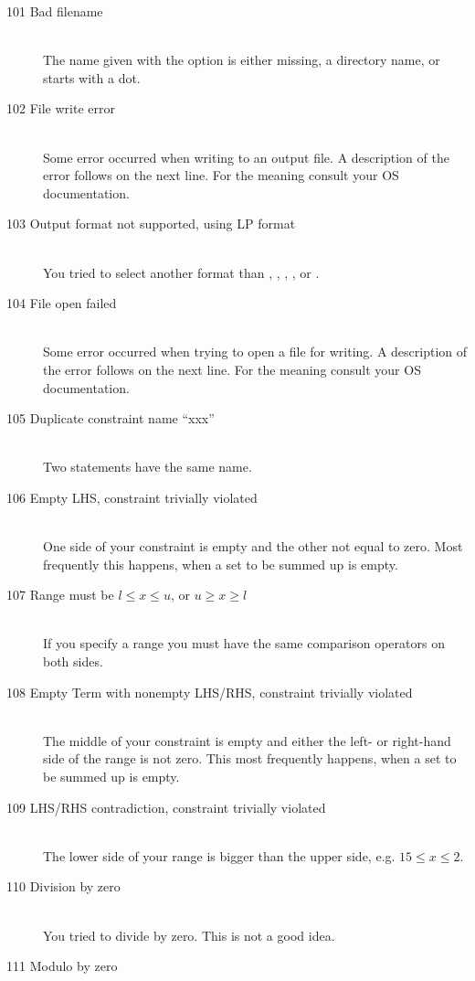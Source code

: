 \begin{description}
%
%
\item[101 Bad filename]\ \\
   The name given with the  option is either missing, 
   a directory name, or starts with a dot.
\item[102 File write error]\ \\
   Some error occurred when writing to an output file. A description of 
   the error follows on the next line. For the meaning 
   consult your OS documentation.
\item[103 Output format not supported, using LP format]\ \\
   You tried to select another format than , ,
   , , or .
\item[104 File open failed]\ \\
   Some error occurred when trying to open a file for writing. A description of 
   the error follows on the next line. For the meaning 
   consult your OS documentation.
%
%
\item[105 Duplicate constraint name ``xxx'']\ \\
   Two  statements have the same name.
\item[106 Empty LHS, constraint trivially violated]\ \\
   One side of your constraint is empty and the other not equal to
   zero. Most frequently this happens, when a set to be summed up is empty.
\item[107 Range must be $l\leq x\leq u$, or $u \geq x\geq l$]\ \\
   If you specify a range you must have the same comparison operators
   on both sides.
\item[108 Empty Term with nonempty LHS/RHS, constraint trivially
   violated]\ \\
   The middle of your constraint is empty and either the left- or
   right-hand side of the range is not zero.
   This most frequently happens, when a set to be summed up is empty.
\item[109 LHS/RHS contradiction, constraint trivially violated]\ \\
   The lower side of your range is bigger than the upper side, e.g.
   $15\leq x\leq 2$. 
\item[110 Division by zero]\ \\
   You tried to divide by zero. This is not a good idea.
\item[111 Modulo by zero]\ \\

\end{description}
